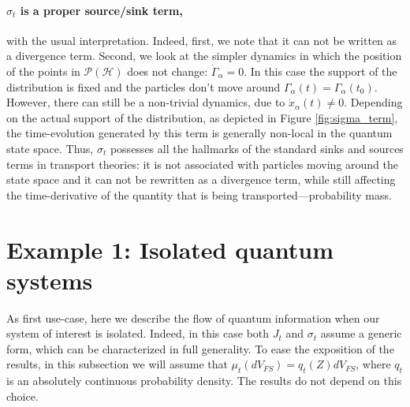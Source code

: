 \documentclass[draft,nofootinbib,pre,twocolumn,showpacs,showkeys,preprintnumbers,floatfix]{revtex4-1}
\newcommand{\1}{\mathbbm{1}}
\newcommand{\PH}{\mathcal{P}(\mathcal{H})}
\begin{document}
\paragraph*{$\sigma_t$ is a proper source/sink term,} with the usual interpretation. Indeed, first, we note that it
can not be written as a divergence term. Second, we look at the simpler dynamics in which the position of the points 
in $\PH$ does not change: $\dot{\Gamma}_\alpha = 0$. In this case the support of the distribution is fixed and the 
particles don't move around $\Gamma_\alpha(t)=\Gamma_\alpha(t_0)$. However, there can still be a non-trivial 
dynamics, due to $\dot{x}_\alpha(t)\neq 0$. Depending on the actual support of the distribution, as depicted in Figure \ref{fig:sigma_term}, 
the time-evolution generated by this term is generally non-local in the 
quantum state space. Thus, $\sigma_t$ possesses all the hallmarks of the standard sinks and sources terms in 
transport theories: it is not associated with particles moving around the state space and it can not be rewritten 
as a divergence term, while still affecting the time-derivative of the quantity that is being transported---probability mass.




\section*{Example 1: Isolated quantum systems}\label{subsec:IQS}

As first use-case, here we describe the flow of quantum information when our system of interest is
isolated. Indeed, in this case both $J_t$ and $\sigma_t$ assume a generic form, which can be characterized
in full generality. To ease the exposition of the results, in this subsection we will assume that $\mu_t(dV_{FS})=q_t(Z)dV_{FS}$, 
where $q_t$ is an absolutely continuous probability density. The results do not depend on this choice. 
\end{document}
